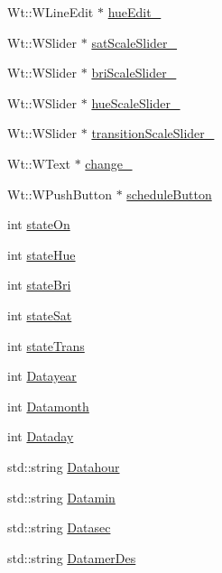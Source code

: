 \begin{DoxyCompactItemize}
\item 
Wt\+::\+W\+Line\+Edit $\ast$ \hyperlink{classGroupsSchedulerControlWidget_a02043bdc5496388bf38cabcc5d935279}{hue\+Edit\+\_\+}
\item 
Wt\+::\+W\+Slider $\ast$ \hyperlink{classGroupsSchedulerControlWidget_a26e978342e055724e5207c3feef19ad5}{sat\+Scale\+Slider\+\_\+}
\item 
Wt\+::\+W\+Slider $\ast$ \hyperlink{classGroupsSchedulerControlWidget_ae5c99df00466aa16314bfd82b105ee0d}{bri\+Scale\+Slider\+\_\+}
\item 
Wt\+::\+W\+Slider $\ast$ \hyperlink{classGroupsSchedulerControlWidget_a659f4a8888ee667ade288dcb50bfaf93}{hue\+Scale\+Slider\+\_\+}
\item 
Wt\+::\+W\+Slider $\ast$ \hyperlink{classGroupsSchedulerControlWidget_aea1b24fe2b88bd7c36981e5d92314cf3}{transition\+Scale\+Slider\+\_\+}
\item 
Wt\+::\+W\+Text $\ast$ \hyperlink{classGroupsSchedulerControlWidget_a80ebbe0358716709bd4d2d5657a08538}{change\+\_\+}
\item 
Wt\+::\+W\+Push\+Button $\ast$ \hyperlink{classGroupsSchedulerControlWidget_a17701e3e2e6b51e7647120900f15d25a}{schedule\+Button}
\item 
int \hyperlink{classGroupsSchedulerControlWidget_a06a6c4a3b732562535e90764b16a9917}{state\+On}
\item 
int \hyperlink{classGroupsSchedulerControlWidget_a36d88417d53236de62a7b0c43c12ba15}{state\+Hue}
\item 
int \hyperlink{classGroupsSchedulerControlWidget_a7b3e5bbcd29fc34ddb8a765481f7d546}{state\+Bri}
\item 
int \hyperlink{classGroupsSchedulerControlWidget_ac8e8767a4971e39f9c238d850d4fd182}{state\+Sat}
\item 
int \hyperlink{classGroupsSchedulerControlWidget_a4432bfb83864771828fc7737e6036f70}{state\+Trans}
\item 
int \hyperlink{classGroupsSchedulerControlWidget_a66ec7faf37c92c1f03c1bb4596cc3d35}{Datayear}
\item 
int \hyperlink{classGroupsSchedulerControlWidget_a8122a727dcb1fecf4024e24c005cf557}{Datamonth}
\item 
int \hyperlink{classGroupsSchedulerControlWidget_a7c82db58f89050af2218d34e5b33cf8b}{Dataday}
\item 
std\+::string \hyperlink{classGroupsSchedulerControlWidget_adbc8d45964535dc6673cf09eecf85c39}{Datahour}
\item 
std\+::string \hyperlink{classGroupsSchedulerControlWidget_a89db2576a184aa1b35a99905eed3cfe3}{Datamin}
\item 
std\+::string \hyperlink{classGroupsSchedulerControlWidget_ae4cf032cf6447ca4a8a04eae4822c939}{Datasec}
\item 
std\+::string \hyperlink{classGroupsSchedulerControlWidget_a4b11331ab0f81e4f3a9bcb950950ee8e}{Datamer\+Des}
\end{DoxyCompactItemize}


